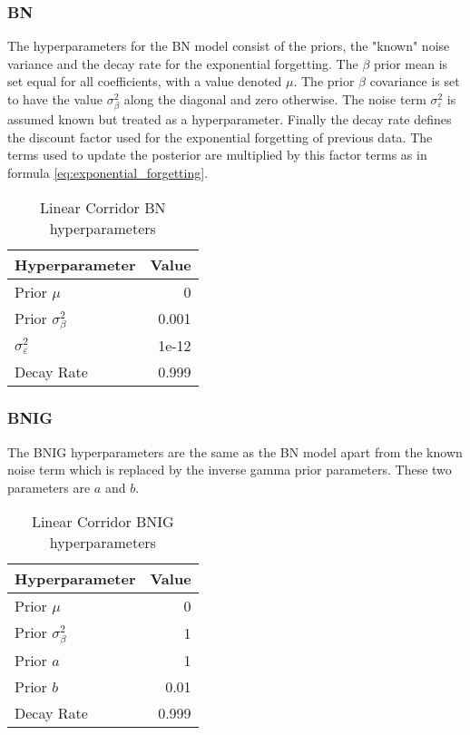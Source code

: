 {{\subsubsection{BN}

The hyperparameters for the BN model consist of the priors, the "known" noise variance and the decay rate for the exponential forgetting. The $\beta$ prior mean is set equal for all coefficients, with a value denoted $\mu$. The prior $\beta$ covariance is set to have the value $\sigma^2_\beta$ along the diagonal and zero otherwise. The noise term $\sigma^2_\varepsilon$ is assumed known but treated as a hyperparameter. Finally the decay rate defines the discount factor used for the exponential forgetting of previous data. The terms used to update the posterior are multiplied by this factor terms as in formula \ref{eq:exponential_forgetting}.

\begin{table}[H]
    \centering
    \begin{tabular}{@{}lr@{}}
        \toprule
        Hyperparameter               & Value \\ \midrule
        Prior $\mu$                  & 0     \\
        Prior $\sigma_\beta^2$       & 0.001 \\
        $\sigma^2_\varepsilon$       & 1e-12 \\
        Decay Rate                   & 0.999 \\ \bottomrule
        \end{tabular}
        \caption{Linear Corridor BN hyperparameters}

\end{table}

\subsubsection{BNIG}

The BNIG hyperparameters are the same as the BN model apart from the known noise term which is replaced by the inverse gamma prior parameters. These two parameters are $a$ and $b$.

\begin{table}[H]
    \centering
    \begin{tabular}{@{}lr@{}}
        \toprule
        Hyperparameter               & Value \\ \midrule
        Prior $\mu$                  & 0     \\
        Prior $\sigma_\beta^2$       & 1 \\
        Prior $a$                    & 1 \\
        Prior $b$                    & 0.01\\
        Decay Rate                   & 0.999 \\ \bottomrule
        \end{tabular}
        \caption{Linear Corridor BNIG hyperparameters}
\end{table}


}}
